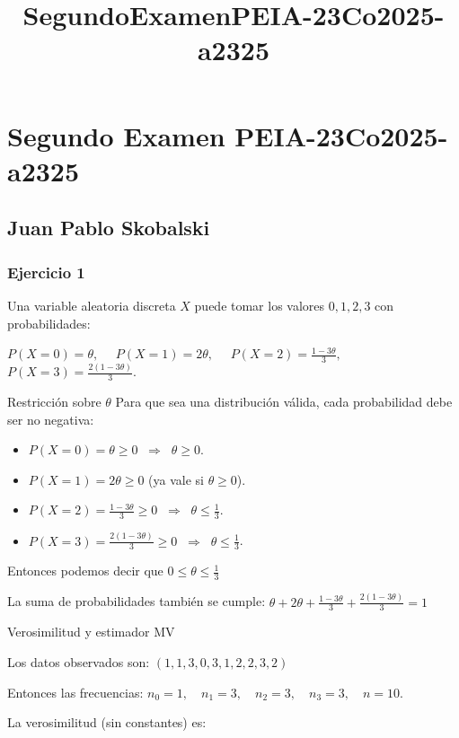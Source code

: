 \documentclass[11pt]{article}
\title{SegundoExamenPEIA-23Co2025-a2325}
\providecommand{\tightlist}{%
      \setlength{\itemsep}{0pt}\setlength{\parskip}{0pt}}
\begin{document}
    
    \setcounter{secnumdepth}{0}
    
    

    
    \section{Segundo Examen
PEIA-23Co2025-a2325}\label{segundo-examen-peia-23co2025-a2325}

\subsection{Juan Pablo Skobalski}\label{juan-pablo-skobalski}

    \subsubsection{Ejercicio 1}\label{ejercicio-1}

Una variable aleatoria discreta \(X\) puede tomar los valores
\(0,1,2,3\) con probabilidades:

\(P(X=0)=\theta, \quad\) \(P(X=1)=2\theta, \quad\)
\(P(X=2)=\frac{1-3\theta}{3}, \quad\) \(P(X=3)=\frac{2(1-3\theta)}{3}.\)

Restricción sobre \(\theta\) Para que sea una distribución válida, cada
probabilidad debe ser no negativa:

\begin{itemize}
\tightlist
\item
  \(P(X=0)=\theta \geq 0 \;\;\Rightarrow\;\; \theta \geq 0\).
\item
  \(P(X=1)=2\theta \geq 0\) (ya vale si \(\theta \geq 0\)).
\item
  \(P(X=2)=\frac{1-3\theta}{3} \geq 0 \;\;\Rightarrow\;\; \theta \leq \tfrac{1}{3}\).
\item
  \(P(X=3)=\frac{2(1-3\theta)}{3} \geq 0 \;\;\Rightarrow\;\; \theta \leq \tfrac{1}{3}\).
\end{itemize}

Entonces podemos decir que \(0 \leq \theta \leq \tfrac{1}{3}\)

La suma de probabilidades también se cumple:
\(\theta + 2\theta + \frac{1-3\theta}{3} + \frac{2(1-3\theta)}{3} = 1\)

Verosimilitud y estimador MV

Los datos observados son: \((1,1,3,0,3,1,2,2,3,2)\)

Entonces las frecuencias:
\(n_0=1, \quad n_1=3, \quad n_2=3, \quad n_3=3, \quad n=10.\)

La verosimilitud (sin constantes) es:
\end{document}
